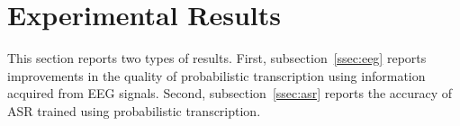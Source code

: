 \section{Experimental Results}
\label{sec:results}

This section reports two types of results.  First,
subsection~\ref{ssec:eeg} reports improvements in the quality of
probabilistic transcription using information acquired from EEG
signals.  Second, subsection~\ref{ssec:asr} reports the accuracy of
ASR trained using probabilistic transcription.

